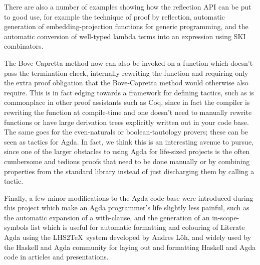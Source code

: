 \documentclass[a4paper]{article}
\begin{document}
There are also a number of examples showing how the reflection API can be put to good use, for example the 
technique of proof by reflection, automatic generation of embedding-projection functions for generic programming,
and the automatic conversion of well-typed lambda terms into an expression using SKI combinators.

The Bove-Capretta method now can also be invoked on a function which doesn't pass the termination check,
internally rewriting the function and requiring only the extra proof obligation that the Bove-Capretta method
would otherwise also require. This is in fact edging towards a framework for defining tactics, such as is commonplace
in other proof assistants such as Coq, since in fact the compiler is rewriting the function at compile-time
and one doesn't need to manually rewrite functions or have large derivation trees explicitly written
out in your code base. The same goes for the even-naturals or boolean-tautology provers; these can be
seen as tactics for Agda. In fact, we think this is an interesting avenue to pursue, since one of the larger
obstacles to using Agda for life-sized projects is the often cumbersome and tedious proofs that need to be
done manually or by combining properties from the standard library instead of just discharging them by calling a
tactic.


Finally, a few minor modifications to the Agda code base were introduced during this project which make an
Agda programmer's life slightly less painful, such as the automatic expansion of a with-clause, and the
generation of an in-scope-symbols list which is useful for automatic formatting and colouring of Literate
Agda using the LHS2\TeX\ system developed by Andres L\"oh, and widely used by the Haskell and Agda community for
laying out and formatting Haskell and Agda code in articles and presentations.
\end{document}
